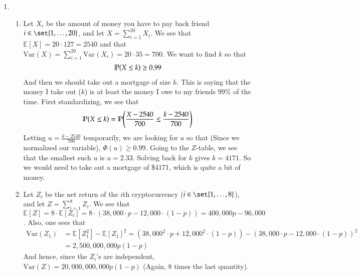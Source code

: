 \documentclass[12pt]{article}
\renewcommand{\P}{\mathbb{P}\qty}
\newcommand{\E}{\mathbb{E}}
\newcommand{\Var}{\mathrm{Var}}
\begin{document}
\begin{enumerate}[leftmargin=\labelsep]
		\newpage
		\item \begin{enumerate}
			\item 
			Let $X_i$ be the amount of money you have to pay back friend $i \in \set{1, \ldots, 20}$, and let $X = \sum_{i=1}^{20} X_i$. We see that $\E[X] = 20 \cdot 127 = 2540$ and that $\Var(X) = \sum_{i=1}^{20} \Var(X_i) = 20 \cdot 35 = 700$. We want to find $k$ so that
			\begin{align*}
				\P(X \leq k) \geq 0.99
			\end{align*}
			And then we should take out a mortgage of size $k$. This is saying that the money I take out ($k$) is at least the money I owe to my friends $99\%$ of the time. First standardizing, we see that
			\begin{align*}
				\P(X \leq k) = \P(\frac{X - 2540}{700} \leq \frac{k-2540}{700})
			\end{align*}
			Letting $u = \frac{k-2540}{700}$ temporarily, we are looking for $u$ so that (Since we normalized our variable), $\Phi(u) \geq 0.99$. Going to the $Z$-table, we see that the smallest such $u$ is $u = 2.33$. Solving back for $k$ gives $k = 4171$. So we would need to take out a mortgage of \$4171, which is quite a bit of money.
			
			\item Let $Z_i$ be the net return of the $i$th cryptocurrency ($ i \in \set{1, \ldots, 8}$), and let $Z = \sum_{i=1}^8 Z_i$. We see that $\E[Z] = 8 \cdot \E[Z_i] = 8 \cdot (38,000 \cdot p - 12,000 \cdot (1-p)) = 400,000p - 96,000$. Also, one sees that 
			\begin{align*}
				\Var(Z_1) &= \E[Z_1^2] - \E[Z_1]^2 = (38,000^2 \cdot p + 12,000^2 \cdot (1-p)) - (38,000 \cdot p - 12,000 \cdot (1-p))^2 \\
				&= 2,500,000,000p(1-p)
			\end{align*}
			And hence, since the $Z_i$'s are independent, $\Var(Z) = 20,000,000,000p(1-p)$ (Again, $8$ times the last quantity).
						

\end{enumerate}
\end{enumerate}
\end{document}
